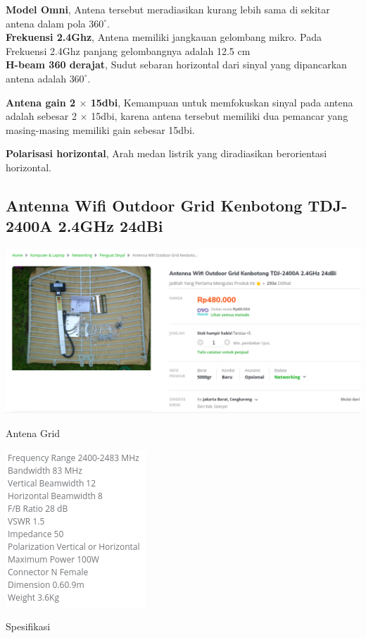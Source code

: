 \documentclass[a4paper,12pt]{article}
\begin{document}
\textbf{Model Omni}, Antena tersebut meradiasikan kurang lebih sama di sekitar antena dalam pola $360^{\circ}$.\\

\textbf{Frekuensi 2.4Ghz}, Antena memiliki jangkauan gelombang mikro. Pada Frekuensi 2.4Ghz panjang gelombangnya adalah
12.5 cm\\

\textbf{H-beam 360 derajat}, Sudut sebaran horizontal dari sinyal yang dipancarkan antena adalah $360^{\circ}$.

\textbf{Antena gain 2 $\times$ 15dbi}, Kemampuan untuk memfokuskan sinyal pada antena adalah sebesar 2 $\times$ 15dbi,
karena antena tersebut memiliki dua pemancar yang masing-masing memiliki gain sebesar 15dbi.

\textbf{Polarisasi horizontal}, Arah medan listrik yang diradiasikan berorientasi horizontal.

\subsection{Antenna Wifi Outdoor Grid Kenbotong TDJ-2400A 2.4GHz 24dBi}
\begin{minipage}{\linewidth}
    \centering
    \includegraphics[scale=.3]{3a.png}\\
    \label{fig:antena_grid}
    \caption{Antena Grid}
\end{minipage}
\begin{minipage}{\linewidth}
    \centering
    \includegraphics[scale=1]{3b.png}\\
    \label{fig:spesifikasi_grid}
    \caption{Spesifikasi}
\end{minipage}
\end{document}
